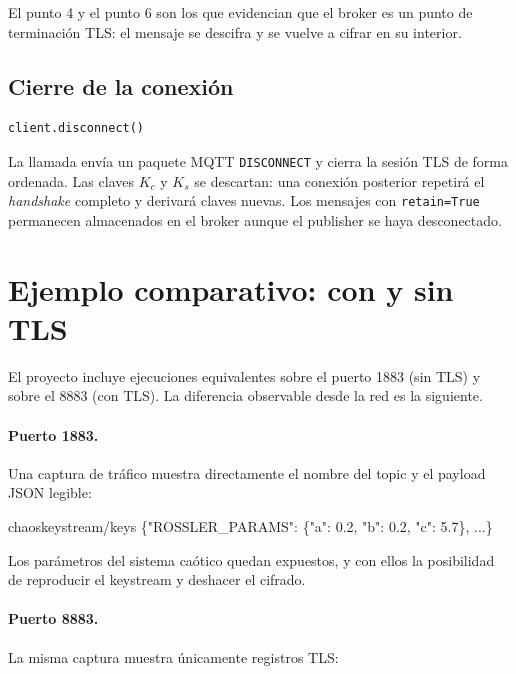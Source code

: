 \documentclass[12pt,a4paper]{article}
\newcommand{\Kc}{K_{c}}
\newcommand{\Ks}{K_{s}}
\begin{document}
El punto 4 y el punto 6 son los que evidencian que el broker es un punto de terminación TLS: el mensaje se descifra y se vuelve a cifrar en su interior.

\subsection{Cierre de la conexión}

\begin{lstlisting}[caption={Desconexión ordenada}]
client.disconnect()
\end{lstlisting}

La llamada envía un paquete MQTT \texttt{DISCONNECT} y cierra la sesión TLS de forma ordenada. Las claves $\Kc$ y $\Ks$ se descartan: una conexión posterior repetirá el \textit{handshake} completo y derivará claves nuevas. Los mensajes con \texttt{retain=True} permanecen almacenados en el broker aunque el publisher se haya desconectado.

\section{Ejemplo comparativo: con y sin TLS}

El proyecto incluye ejecuciones equivalentes sobre el puerto 1883 (sin TLS) y sobre el 8883 (con TLS). La diferencia observable desde la red es la siguiente.

\paragraph{Puerto 1883.} Una captura de tráfico muestra directamente el nombre del topic y el payload JSON legible:

\begin{center}
\ttfamily\small
chaoskeystream/keys \{"ROSSLER\_PARAMS": \{"a": 0.2, "b": 0.2, "c": 5.7\}, ...\}
\end{center}

Los parámetros del sistema caótico quedan expuestos, y con ellos la posibilidad de reproducir el keystream y deshacer el cifrado.

\paragraph{Puerto 8883.} La misma captura muestra únicamente registros TLS:
\end{document}

